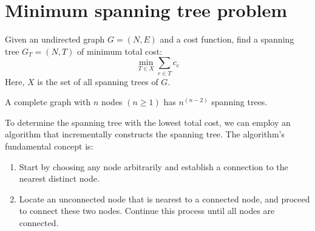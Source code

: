 \section{Minimum spanning tree problem}

Given an undirected graph $G=(N,E)$ and a cost function, find a spanning tree $G_T=(N,T)$ of minimum total cost: 
\[\min_{T \in X} \sum_{e \in T}c_e\]
Here, $X$ is the set of all spanning trees of $G$. 
\begin{theorem}
    A complete graph with $n$ nodes $(n \geq 1)$ has $n^{(n-2)}$ spanning trees. 
\end{theorem}
To determine the spanning tree with the lowest total cost, we can employ an algorithm that incrementally constructs the spanning tree. 
The algorithm's fundamental concept is:
\begin{enumerate}
    \item Start by choosing any node arbitrarily and establish a connection to the nearest distinct node.
    \item Locate an unconnected node that is nearest to a connected node, and proceed to connect these two nodes. 
        Continue this process until all nodes are connected.
\end{enumerate}
